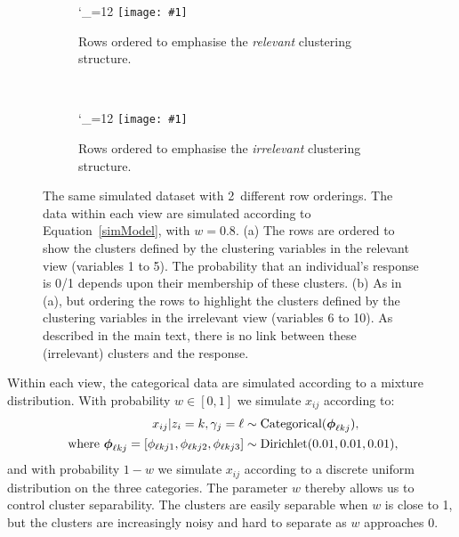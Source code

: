 \documentclass[12pt]{article}
\newcommand{\PPPlotFrameB}[1]{%
\texttt{[image: \#1]}\endgroup}
\def\PPPlotFrame{\begingroup 
\catcode`\_=12
\PPPlotFrameB}
\begin{document}
 \begin{figure}[h]
    \centering
    \begin{subfigure}[b]{.48\textwidth}
\PPPlotFrame{Figures/dataVisualisationAnnotatedCols2.pdf}
        \caption{Rows ordered to emphasise the {\em relevant} clustering structure.}%
        \label{figSimExA}
    \end{subfigure}
    ~ %
    \begin{subfigure}[b]{.48\textwidth}
\PPPlotFrame{Figures/dataVisualisationNEWAnnotatedCols2.pdf}
        \caption{Rows ordered to emphasise the {\em irrelevant} clustering structure.}%
        \label{figSimExB}
    \end{subfigure}
    \caption{The same simulated dataset with 2~different row orderings.  The data within each view are simulated according to Equation~\eqref{simModel}, with $w = 0.8$. (a) The rows are ordered to show the clusters defined by the clustering variables in the relevant view (variables 1 to 5).  The probability that an individual's response is 0/1 depends upon their membership of these clusters.  (b)  As in (a), but ordering the rows to highlight the clusters defined by the clustering variables in the irrelevant view (variables 6 to 10).  As described in the main text, there is no link between these (irrelevant) clusters and the response. }\label{figSimEx}%
\end{figure}


Within each view, the categorical data are simulated according to a mixture distribution.  With probability $w \in [0,1]$ we simulate $x_{ij}$ according to:
\begin{align}
x_{ij} | z_i = k, \gamma_j = \ell &\sim \textrm{Categorical}(\boldsymbol{\phi}_{\ell kj}),\notag\\
\mbox{ where }\boldsymbol{\phi}_{\ell kj} = [{\phi}_{\ell kj1}, {\phi}_{\ell kj2}, {\phi}_{\ell kj3}] &\sim \textrm{Dirichlet}(0.01, 0.01, 0.01),\label{simModel}
\end{align} 
and with probability $1 - w$ we simulate $x_{ij}$ according to a discrete uniform distribution on the three categories.  The parameter $w$ thereby allows us to control cluster separability.  The clusters are easily separable when $w$ is close to 1,  but the clusters are increasingly noisy and hard to separate as $w$ approaches 0. 
\end{document}
